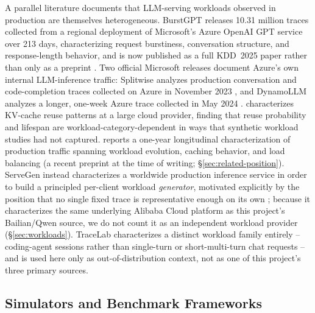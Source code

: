 A parallel literature documents that LLM-serving workloads observed in
production are themselves heterogeneous. BurstGPT releases 10.31 million
traces collected from a regional deployment of Microsoft's Azure OpenAI GPT
service over 213 days, characterizing request burstiness, conversation
structure, and response-length behavior, and is now published as a full
KDD~2025 paper rather than only as a preprint \citep{burstgpt2025}. Two
official Microsoft releases document Azure's own internal LLM-inference
traffic: Splitwise analyzes production conversation and code-completion
traces collected on Azure in November 2023 \citep{patel2024splitwise}, and
DynamoLLM analyzes a longer, one-week Azure trace collected in May 2024
\citep{stojkovic2025dynamollm}. \citet{kvcache_wild2025} characterizes
KV-cache reuse patterns at a large cloud provider, finding that reuse
probability and lifespan are workload-category-dependent in ways that
synthetic workload studies had not captured. \citet{ayearinllmserving2026}
reports a one-year longitudinal characterization of production traffic
spanning workload evolution, caching behavior, and load balancing (a recent
preprint at the time of writing; \S\ref{sec:related-position}).
ServeGen instead characterizes a worldwide production inference service in
order to build a principled per-client workload \emph{generator}, motivated
explicitly by the position that no single fixed trace is representative
enough on its own \citep{servegen2026}; because it characterizes the same
underlying Alibaba Cloud platform as this project's Bailian/Qwen source, we
do not count it as an independent workload provider (\S\ref{sec:workloads}).
TraceLab characterizes a distinct workload family entirely -- coding-agent
sessions rather than single-turn or short-multi-turn chat requests -- and is
used here only as out-of-distribution context, not as one of this
project's three primary sources.

\subsection{Simulators and Benchmark Frameworks}
\label{sec:related-simulators}

